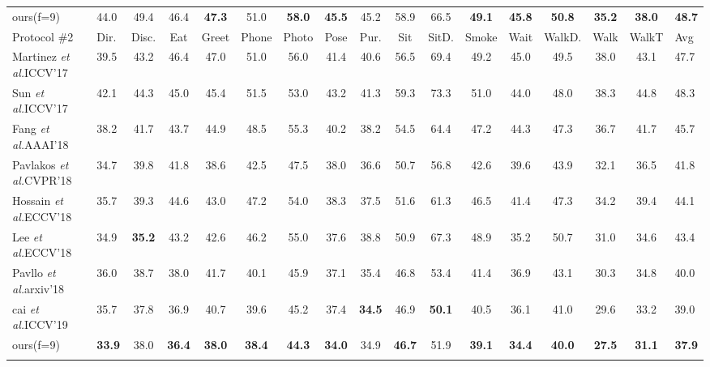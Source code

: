 \documentclass{article}
\begin{document}
\begin{table}[h]
\begin{center}
{\begin{tabular}{l|lcccccccccccccc|l}
\hline
\noalign{\smallskip}
ours(f=9)                                                &44.0 &49.4 &46.4 &\textbf{47.3} &51.0 &\textbf{58.0} &\textbf{45.5} &45.2 &58.9 &66.5 &\textbf{49.1} &\textbf{45.8} &\textbf{50.8} &\textbf{35.2} &\textbf{38.0} &\textbf{48.7}\\
\noalign{\smallskip}
\toprule[2pt]
\noalign{\smallskip}
Protocol {\#2} 	                      &Dir.&Disc.&Eat &Greet &Phone &Photo &Pose &Pur. &Sit &SitD. &Smoke &Wait &WalkD. &Walk &WalkT & Avg\\
\noalign{\smallskip}
\hline
\noalign{\smallskip}
Martinez {\it et al.}\cite{Sun_2017_ICCV}ICCV’17     &39.5 &43.2 &46.4 &47.0 &51.0 &56.0 &41.4 &40.6 &56.5 &69.4 &49.2 &45.0 &49.5 &38.0 &43.1 &47.7\\
Sun {\it et al.}\cite{liang2018compositional}ICCV'17  &42.1 &44.3 &45.0 &45.4 &51.5 &53.0 &43.2 &41.3 &59.3 &73.3 &51.0 &44.0 &48.0 &38.3 &44.8 &48.3\\
Fang {\it et al.}\cite{Fang2018LearningPG}AAAI’18    &38.2 &41.7 &43.7 &44.9 &48.5 &55.3 &40.2 &38.2 &54.5 &64.4 &47.2 &44.3 &47.3 &36.7 &41.7 &45.7\\
Pavlakos {\it et al.}\cite{pavlakos2018ordinal}CVPR'18&34.7 &39.8 &41.8 &38.6 &42.5 &47.5 &38.0 &36.6 &50.7 &56.8 &42.6 &39.6 &43.9 &32.1 &36.5 &41.8\\
Hossain {\it et al.}\cite{hossain2018exploiting}ECCV’18 &35.7 &39.3 &44.6 &43.0 &47.2 &54.0 &38.3 &37.5 &51.6 &61.3 &46.5 &41.4 &47.3 &34.2 &39.4 &44.1\\
Lee {\it et al.}\cite{lee2018propagating}ECCV'18      &34.9 &\textbf{35.2} &43.2 &42.6 &46.2 &55.0 &37.6 &38.8 &50.9 &67.3 &48.9 &35.2 &50.7 &31.0 &34.6 &43.4\\
Pavllo {\it et al.}\cite{pavllo20193d}arxiv’18       &36.0 &38.7 &38.0 &41.7 &40.1 &45.9 &37.1 &35.4 &46.8 &53.4 &41.4 &36.9 &43.1 &30.3 &34.8 &40.0\\
cai {\it et al.}\cite{Cai_2019_ICCV}ICCV’19	              &35.7 &37.8 &36.9 &40.7 &39.6 &45.2 &37.4 &\textbf{34.5} &46.9 &\textbf{50.1} &40.5 &36.1 &41.0 &29.6 &33.2 &39.0\\
\hline
\noalign{\smallskip}
ours(f=9)                                            &\textbf{33.9} &38.0 &\textbf{36.4} &\textbf{38.0} &\textbf{38.4} &\textbf{44.3} &\textbf{34.0} &34.9 &\textbf{46.7} &51.9 &\textbf{39.1} &\textbf{34.4} &\textbf{40.0} &\textbf{27.5} &\textbf{31.1} &\textbf{37.9}\\
\noalign{\smallskip}
\toprule[2pt]

\end{tabular}}
\end{center}
\end{table}
\end{document}
